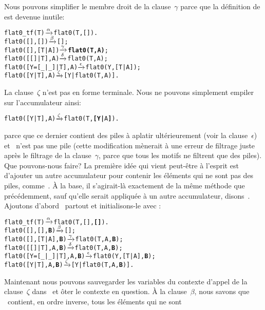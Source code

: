Nous pouvons simplifier le membre droit de la clause~\(\gamma\) parce
que la définition de  est devenue inutile:
\begin{alltt}
flat0\_tf(T)              \(\smashedrightarrow{\alpha}\) flat0(T,[]).
flat0(         [],   []) \(\smashedrightarrow{\beta}\) [];
flat0(         [],[T|A]) \(\smashedrightarrow{\gamma}\) \textbf{flat0(T,A)};\hfill% \emph{Simplification}
flat0(     [[]|T],    A) \(\smashedrightarrow{\delta}\) flat0(T,A);
flat0([Y=[\_|\_]|T],    A) \(\smashedrightarrow{\epsilon}\) flat0(Y,[T|A]);
flat0(      [Y|T],    A) \(\smashedrightarrow{\zeta}\) [Y|flat0(T,A)].
\end{alltt}
La clause~\(\zeta\) n'est pas en forme terminale. Nous ne pouvons
simplement empiler~ sur l'accumulateur ainsi:
\begin{alltt}
flat0(      [Y|T],    A) \(\smashedrightarrow{\zeta}\) flat0(T,\textbf{[Y|}A\textbf{]}).\hfill% \emph{Faux}
\end{alltt}
parce que ce dernier contient des piles à aplatir ultérieurement (voir
la clause~\(\epsilon\)) et ~n'est pas une pile (cette
modification mènerait à une erreur de filtrage juste après le filtrage
de la clause~\(\gamma\), parce que tous les motifs ne filtrent que des
piles). Que pouvons-nous faire? La première idée qui vient peut-être à
l'esprit est d'ajouter un autre accumulateur pour contenir les
éléments qui ne sont pas des piles, comme~. À la base, il
s'agirait-là exactement de la même méthode que précédemment, sauf
qu'elle serait appliquée à un autre accumulateur,
disons~. Ajoutons d'abord~ partout et
initialisons-le avec \erlcode{[]}:
\begin{alltt}
flat0_tf(T)                \(\smashedrightarrow{\alpha}\) flat0(T,[],\textbf{[]}).
flat0(         [],   [],\textbf{B}) \(\smashedrightarrow{\beta}\) [];\hfill% B \emph{inutile pour le moment}
flat0(         [],[T|A],\textbf{B}) \(\smashedrightarrow{\gamma}\) flat0(T,A,\textbf{B});
flat0(     [[]|T],    A,\textbf{B}) \(\smashedrightarrow{\delta}\) flat0(T,A,\textbf{B});
flat0([Y=[\_|\_]|T],    A,\textbf{B}) \(\smashedrightarrow{\epsilon}\) flat0(Y,[T|A],\textbf{B});
flat0(      [Y|T],    A,\textbf{B}) \(\smashedrightarrow{\zeta}\) [Y|flat0(T,A,\textbf{B})].
\end{alltt}
Maintenant nous pouvons sauvegarder les variables du contexte d'appel
de la clause~\(\zeta\) dans~ et ôter le contexte en
question.  À la clause~\(\beta\), nous savons que
~contient, en ordre inverse, tous les éléments qui ne sont
